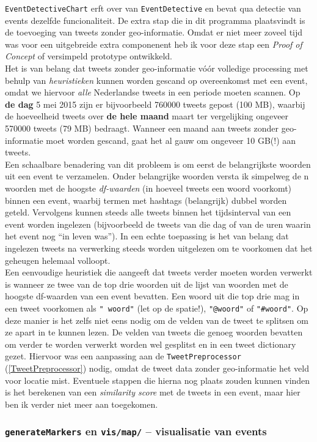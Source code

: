 \documentclass[a4paper,10pt,titlepage]{article}
\def\vl{\\[9pt]}                              %
\def\sss{\subsubsection}                      %
\def\ttt{\texttt}                             %
\def\it{\textit}                              %
\def\bf{\textbf}                              %
\begin{document}
{{\ttt{EventDetectiveChart} erft over van \ttt{EventDetective} en bevat qua detectie van 
events dezelfde funcionaliteit. De extra stap die in dit programma plaatsvindt 
is de toevoeging van tweets zonder geo-informatie. Omdat er niet meer zoveel 
tijd was voor een uitgebreide extra componenent heb ik voor deze stap een \it{Proof 
of Concept} of versimpeld prototype ontwikkeld.
\vl
Het is van belang dat tweets zonder geo-informatie vóór volledige processing met 
behulp van \it{heuristieken} kunnen worden gescand op overeenkomst met een event, 
omdat we hiervoor \it{alle} Nederlandse tweets in een periode moeten scannen. Op \bf{de 
dag} 5 mei 2015 zijn er bijvoorbeeld 760000 tweets gepost (100 MB), waarbij de 
hoeveelheid tweets over \bf{de hele maand} maart ter vergelijking ongeveer 570000 
tweets (79 MB) bedraagt. Wanneer een maand aan tweets zonder geo-informatie moet 
worden gescand, gaat het al gauw om ongeveer 10 GB(!) aan tweets.
\vl
Een schaalbare benadering van dit probleem is om eerst de belangrijkste woorden 
uit een event te verzamelen. Onder belangrijke woorden versta ik simpelweg de n 
woorden met de hoogste \it{df-waarden} (in hoeveel tweets een woord voorkomt) binnen 
een event, waarbij termen met hashtags (belangrijk) dubbel worden geteld. Vervolgens
kunnen steeds alle tweets binnen het tijdsinterval van een event worden ingelezen 
(bijvoorbeeld de tweets van die dag of van de uren waarin het event nog ``in leven
was''). In een echte toepassing is het van belang dat ingelezen tweets na 
verwerking steeds worden uitgelezen om te voorkomen dat het geheugen helemaal volloopt. 
\vl
Een eenvoudige heuristiek die aangeeft dat tweets verder moeten worden verwerkt 
is wanneer ze twee van de top drie woorden uit de lijst van woorden met de 
hoogste df-waarden van een event bevatten. Een woord uit die top drie mag in een 
tweet voorkomen als \ttt{"\ woord"} (let op de spatie!), \ttt{"@woord"} of \ttt{"\#woord"}. Op deze 
manier is het zelfs niet eens nodig om de velden van de tweet te splitsen om ze 
apart in te kunnen lezen. De velden van tweets die genoeg woorden bevatten om 
verder te worden verwerkt worden wel gesplitst en in een tweet dictionary gezet. 
Hiervoor was een aanpassing aan de \ttt{TweetPreprocessor} (\ref{TweetPreprocessor}) nodig, omdat de 
tweet data zonder geo-informatie het veld voor locatie mist. Eventuele stappen 
die hierna nog plaats zouden kunnen vinden is het berekenen van een \it{similarity 
score} met de tweets in een event, maar hier ben ik verder niet meer aan 
toegekomen.

\sss{\ttt{generateMarkers} en \ttt{vis/map/} – visualisatie van events}

}}
\end{document}
